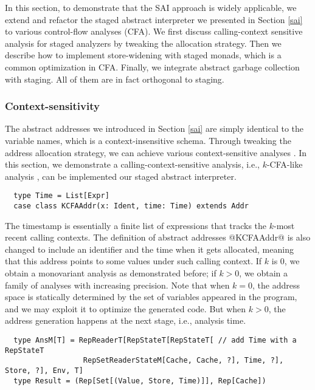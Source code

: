 In this section, to demonstrate that the SAI approach is widely applicable, we
extend and refactor the staged abstract interpreter we presented in Section
\ref{sai} to various control-flow analyses (CFA). We first discuss
calling-context sensitive analysis for staged analyzers by tweaking the
allocation strategy. Then we describe how to implement store-widening with
staged monads, which is a common optimization in CFA. Finally, we integrate
abstract garbage collection with staging. All of them are in fact orthogonal to
staging.

\subsubsection{Context-sensitivity}

The abstract addresses we introduced in Section \ref{sai} are simply identical
to the variable names, which is a context-insensitive schema.  Through tweaking
the address allocation strategy, we can achieve various context-sensitive
analyses \cite{DBLP:conf/icfp/Gilray0M16}. In this section, we demonstrate a
calling-context-sensitive analysis, i.e., $k$-CFA-like analysis
\cite{DBLP:journals/jfp/HornM12}, can be implemented our staged abstract
interpreter.
\begin{lstlisting}
  type Time = List[Expr]
  case class KCFAAddr(x: Ident, time: Time) extends Addr
\end{lstlisting}

The timestamp is essentially a finite list of expressions that tracks the $k$-most
recent calling contexts. The definition of abstract addresses @KCFAAddr@ is also
changed to include an identifier and the time when it gets allocated, meaning that
this address points to some values under such calling context. If $k$ is 0, we
obtain a monovariant analysis as demonstrated before; if $k > 0$, we obtain a
family of analyses with increasing precision. Note that when $k = 0$, the
address space is statically determined by the set of variables appeared in the
program, and we may exploit it to optimize the generated code. But when $k > 0$,
the address generation happens at the next stage, i.e., analysis time.
\begin{lstlisting}
  type AnsM[T] = RepReaderT[RepStateT[RepStateT[ // add Time with a RepStateT
                  RepSetReaderStateM[Cache, Cache, ?], Time, ?], Store, ?], Env, T]
  type Result = (Rep[Set[(Value, Store, Time)]], Rep[Cache])
\end{lstlisting}

